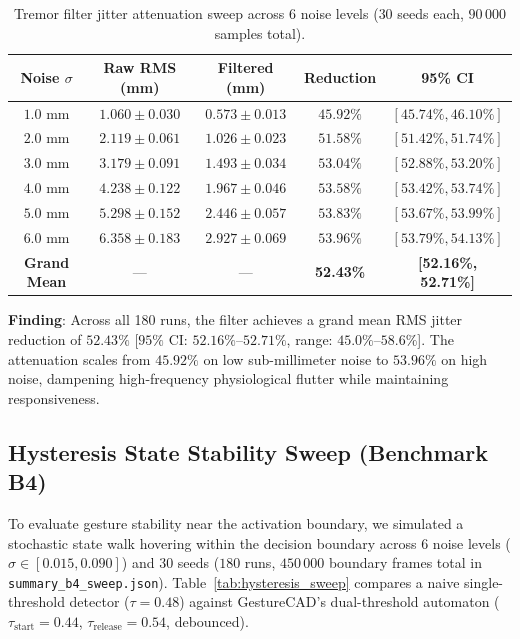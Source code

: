 \begin{table}[t]
\caption{Tremor filter jitter attenuation sweep across 6 noise levels ($30$ seeds each, $90\,000$ samples total).}
\label{tab:jitter_sweep}
\centering
\small
\begin{tabular}{ccccc}
\toprule
\textbf{Noise $\sigma$} & \textbf{Raw RMS (mm)} & \textbf{Filtered (mm)} & \textbf{Reduction} & \textbf{95\% CI} \\
\midrule
$1.0\text{ mm}$ & $1.060 \pm 0.030$ & $0.573 \pm 0.013$ & $45.92\%$ & $[45.74\%, 46.10\%]$ \\
$2.0\text{ mm}$ & $2.119 \pm 0.061$ & $1.026 \pm 0.023$ & $51.58\%$ & $[51.42\%, 51.74\%]$ \\
$3.0\text{ mm}$ & $3.179 \pm 0.091$ & $1.493 \pm 0.034$ & $53.04\%$ & $[52.88\%, 53.20\%]$ \\
$4.0\text{ mm}$ & $4.238 \pm 0.122$ & $1.967 \pm 0.046$ & $53.58\%$ & $[53.42\%, 53.74\%]$ \\
$5.0\text{ mm}$ & $5.298 \pm 0.152$ & $2.446 \pm 0.057$ & $53.83\%$ & $[53.67\%, 53.99\%]$ \\
$6.0\text{ mm}$ & $6.358 \pm 0.183$ & $2.927 \pm 0.069$ & $53.96\%$ & $[53.79\%, 54.13\%]$ \\
\midrule
\textbf{Grand Mean} & — & — & \textbf{52.43\%} & \textbf{[52.16\%, 52.71\%]} \\
\bottomrule
\end{tabular}
\end{table}

\textbf{Finding}: Across all 180 runs, the filter achieves a grand mean RMS jitter reduction of $52.43\%$ [$95\%$ CI: $52.16\%$–$52.71\%$, range: $45.0\%$–$58.6\%$]. The attenuation scales from $45.92\%$ on low sub-millimeter noise to $53.96\%$ on high noise, dampening high-frequency physiological flutter while maintaining responsiveness.

\subsection{Hysteresis State Stability Sweep (Benchmark B4)}
To evaluate gesture stability near the activation boundary, we simulated a stochastic state walk hovering within the decision boundary across 6 noise levels ($\sigma \in [0.015, 0.090]$) and 30 seeds ($180$ runs, $450\,000$ boundary frames total in \texttt{summary\_b4\_sweep.json}). Table~\ref{tab:hysteresis_sweep} compares a naive single-threshold detector ($\tau = 0.48$) against GestureCAD's dual-threshold automaton ($\tau_{\text{start}} = 0.44$, $\tau_{\text{release}} = 0.54$, debounced).

